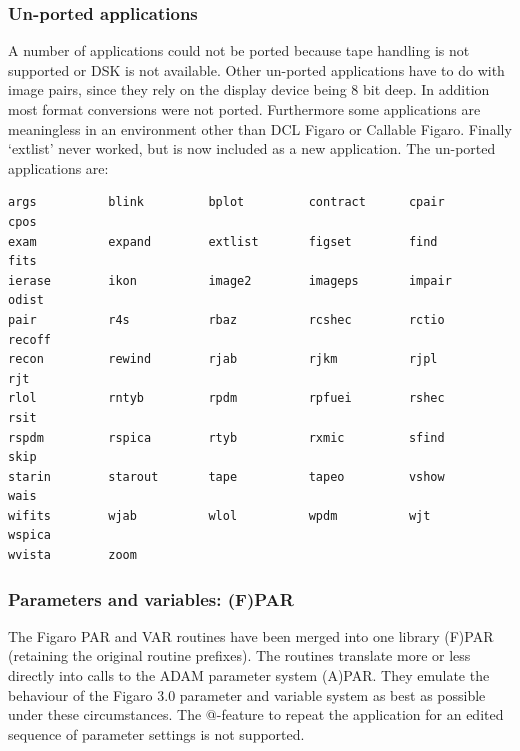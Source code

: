 \documentclass[11pt,twoside]{article}
\begin{document}

\subsubsection{\label{changessub4}Un-ported applications}

   A number of applications could not be ported because tape handling is
   not supported or DSK is not available.  Other un-ported applications
   have to do with image pairs, since they rely on the display device
   being 8 bit deep.  In addition most format conversions were not
   ported. Furthermore some applications are meaningless in an
   environment other than DCL Figaro or Callable Figaro.  Finally
   `extlist' never worked, but is now included as a new application. The
   un-ported applications are:

\begin{verbatim}
args          blink         bplot         contract      cpair         cpos
exam          expand        extlist       figset        find          fits
ierase        ikon          image2        imageps       impair        odist
pair          r4s           rbaz          rcshec        rctio         recoff
recon         rewind        rjab          rjkm          rjpl          rjt
rlol          rntyb         rpdm          rpfuei        rshec         rsit
rspdm         rspica        rtyb          rxmic         sfind         skip
starin        starout       tape          tapeo         vshow         wais
wifits        wjab          wlol          wpdm          wjt           wspica
wvista        zoom
\end{verbatim}


\subsubsection{\label{changessub5}Parameters and variables: (F)PAR}

   The Figaro PAR and VAR routines have been merged into one library
   (F)PAR (retaining the original routine prefixes). The routines
   translate more or less directly into calls to the ADAM parameter
   system (A)PAR. They emulate the behaviour of the Figaro 3.0 parameter
   and variable system as best as possible under these circumstances.
   The @-feature to repeat the application for an edited sequence of
   parameter settings is not supported.
\end{document}
